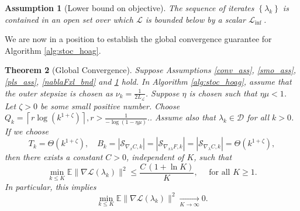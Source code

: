 \documentclass[11pt, twoside]{report}
\newtheorem{theorem}{Theorem}[section]
\newtheorem{assumption}[theorem]{Assumption}
\begin{document}
\begin{assumption}[Lower bound on objective] \label{inf_ass}
    The sequence of iterates $\left\{\lambda_k\right\}$ is contained in an open set over which $\mathcal{L}$ is bounded below by a scalar $\mathcal{L}_{\text {inf }}$.
\end{assumption}
We are now in a position to establish the global convergence guarantee for Algorithm \ref{alg:stoc_hoag}.

\begin{theorem}[Global Convergence] \label{hoag_thm_glcv}
Suppose Assumptions \ref{conv_ass}, \ref{smo_ass}, \ref{pls_ass}, \ref{nablaFxl_bnd} and \ref{inf_ass} hold.
In Algorithm \ref{alg:stoc_hoag}, assume that the outer stepsize is chosen as $\nu_k = \frac{1}{2L_\mathcal{L}}$. Suppose $\eta$ is chosen such that $\eta \mu < 1$. Let $\zeta > 0$ be some small positive number. Choose $Q_k=\left\lceil r\log(k^{1+\zeta})\right\rceil,
r>\frac{1}{-\log(1-\eta\mu)}.$. Assume also that $\lambda_k \in \mathcal{D}$ for all $k>0$.
If we choose
\begin{equation}\label{params_conv}
    T_k = \Theta(k^{1+\zeta}), \quad 
    B_k = |\mathcal{S}_{\nabla_x C,k}| = |\mathcal{S}_{\nabla_{x\lambda} F,k}| = |\mathcal{S}_{\nabla_\lambda C,k}| = \Theta(k^{1+\zeta}),
\end{equation}
then there exists a constant $C > 0$, independent of $K$, such that
\begin{equation}
\min_{k \le K} \mathbb{E}\|\nabla \mathcal{L}(\lambda_k)\|^2 \le \frac{C \,(1 + \ln K)}{K}, \quad \text{ for all } K \ge 1.
\end{equation}
In particular, this implies
\[
\min_{k \leq K} \mathbb{E}\|\nabla \mathcal{L}(\lambda_k)\|^2 \xrightarrow[K \to \infty]{} 0.
\]
\end{theorem}
\end{document}
